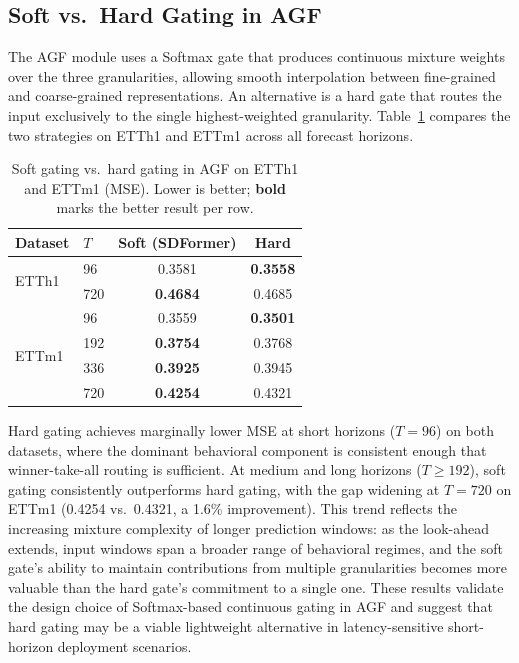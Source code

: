 \documentclass[journal]{IEEEtran}
\begin{document}
\subsection{Soft vs.\ Hard Gating in AGF}

The AGF module uses a Softmax gate that produces continuous mixture
weights over the three granularities, allowing smooth interpolation
between fine-grained and coarse-grained representations.
An alternative is a hard gate that routes the input exclusively to the
single highest-weighted granularity.
Table~\ref{tab:gating} compares the two strategies on ETTh1 and ETTm1
across all forecast horizons.

\begin{table}[!t]
\caption{Soft gating vs.\ hard gating in AGF on ETTh1 and ETTm1 (MSE).
  Lower is better; \textbf{bold} marks the better result per row.}
\label{tab:gating}
\centering
\renewcommand{\arraystretch}{1.15}
\begin{tabular}{llcc}
\toprule
\textbf{Dataset} & $T$ & \textbf{Soft (SDFormer)} & \textbf{Hard} \\
\midrule
\multirow{2}{*}{ETTh1}
 & 96  & 0.3581 & \textbf{0.3558} \\
 & 720 & \textbf{0.4684} & 0.4685 \\
\midrule
\multirow{4}{*}{ETTm1}
 & 96  & 0.3559 & \textbf{0.3501} \\
 & 192 & \textbf{0.3754} & 0.3768 \\
 & 336 & \textbf{0.3925} & 0.3945 \\
 & 720 & \textbf{0.4254} & 0.4321 \\
\bottomrule
\end{tabular}
\end{table}

Hard gating achieves marginally lower MSE at short horizons ($T = 96$)
on both datasets, where the dominant behavioral component is consistent
enough that winner-take-all routing is sufficient.
At medium and long horizons ($T \geq 192$), soft gating consistently
outperforms hard gating, with the gap widening at $T = 720$ on ETTm1
(0.4254 vs.\ 0.4321, a 1.6\% improvement).
This trend reflects the increasing mixture complexity of longer prediction
windows: as the look-ahead extends, input windows span a broader range of
behavioral regimes, and the soft gate's ability to maintain contributions
from multiple granularities becomes more valuable than the hard gate's
commitment to a single one.
These results validate the design choice of Softmax-based continuous
gating in AGF and suggest that hard gating may be a viable lightweight
alternative in latency-sensitive short-horizon deployment scenarios.
\end{document}

